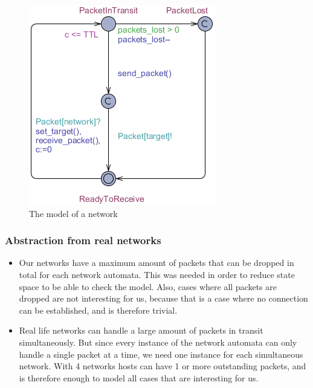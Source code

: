 \documentclass[twocolumn]{article}
\begin{document}
\begin{figure}[h!]
	\begin{center}
		\includegraphics[width=\linewidth]{network_model}
	\end{center}
	\caption{The model of a network}
	\label{fig:figure1}
\end{figure}


\subsubsection{Abstraction from real networks}
\begin{itemize}
\item Our networks have a maximum amount of packets that can be dropped in total for each network automata. This was needed in order to reduce state space to be able to check the model. Also, cases where all packets are dropped are not interesting for us, because that is a case where no connection can be established, and is therefore trivial.
\item Real life networks can handle a large amount of packets in transit simultaneously. But since every instance of the network automata can only handle a single packet at a time, we need one instance for each simultaneous network. With 4 networks hosts can have 1 or more outstanding packets, and is therefore enough to model all cases that are interesting for us.
\end{itemize}
\end{document}
